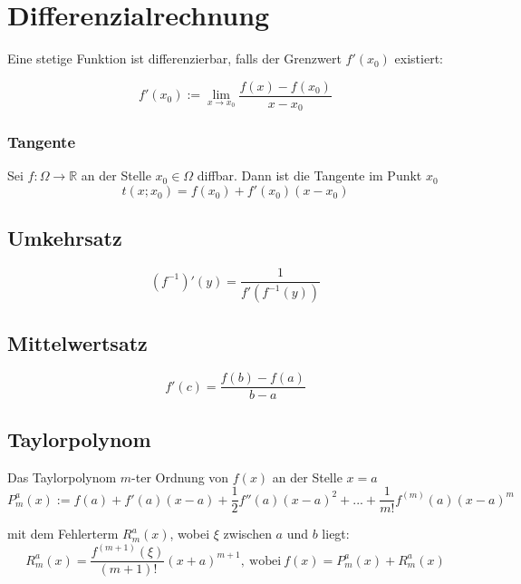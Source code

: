 \section{Differenzialrechnung}

Eine stetige Funktion ist differenzierbar, falls der Grenzwert $f'(x_0)$ existiert:

\begin{equation*}
	f'(x_0) := \lim_{x\to x_0}\frac{f(x) - f(x_0)}{x-x_0}
\end{equation*}
\subsubsection*{Tangente}
		Sei $f: \Omega \to \mathbb{R}$ an der Stelle $x_0 \in \Omega$ diffbar. Dann ist die Tangente im Punkt $x_0$
		\[ t(x; x_0)=f(x_0)+f'(x_0)(x-x_0) \]

\subsection{Umkehrsatz}

\begin{equation*}
	(f^{-1})'(y) = \frac{1}{f'(f^{-1}(y))}
\end{equation*}

\subsection{Mittelwertsatz}

\begin{equation*}
	f'(c) = \frac{f(b) - f(a)}{b - a}
\end{equation*}

\subsection{Taylorpolynom}

Das Taylorpolynom $m$-ter Ordnung von $f(x)$ an der Stelle $x=a$
\begin{equation*}
	P^a_m(x) := f(a) + f'(a)(x-a) + \frac{1}{2}f''(a)(x-a)^2 + ... + \frac{1}{m!} f^{(m)}(a)(x-a)^m
\end{equation*}

mit dem Fehlerterm $R^a_m(x)$, wobei $\xi$ zwischen $a$ und $b$ liegt:
\begin{equation*}
	R^a_m(x) = \frac{f^{(m+1)}(\xi)}{(m+1)!}(x+a)^{m+1},\ \text{wobei}\ f(x) = P^a_m(x) + R^a_m(x)
\end{equation*}

